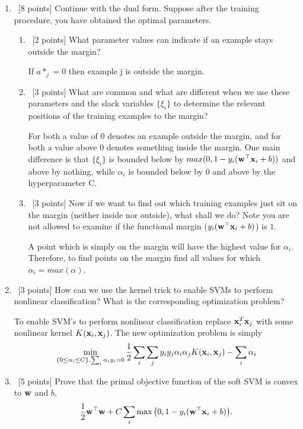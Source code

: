 \documentclass[12pt, fullpage,letterpaper]{article}
\begin{document}
\begin{enumerate}
	\item~[8 points] Continue with the dual form. Suppose after the training procedure, you have obtained the optimal parameters.
	\begin{enumerate}
		\item~[2 points] What parameter values can indicate if an example stays outside the margin?
		
		If $a*_j = 0$ then example j is outside the margin.
		
		\item~[3 points] What are common and what are different when we use these parameters and the slack variables $\{\xi_i\}$ to determine the relevant positions of the training examples to the margin?
		
		For both a value of 0 denotes an example outside the margin, and for both a value above 0 denotes something inside the margin. One main difference is that $\{\xi_i\}$ is bounded below by $max(0, 1 - y_i({\bf w}^\top {\bf x}_i + b))$ and above by nothing, while $\alpha_i$ is bounded below by 0 and above by the hyperparameter C.
		
		\item~[3 points] Now if we want to find out which training examples just sit on the margin (neither inside nor outside), what shall we do? Note you are not allowed to examine if the functional margin (\ie $y_i({\bf w}^\top{\bf x}_i +b)$) is $1$.
		
		A point which is simply on the margin will have the highest value for $\alpha_i$. Therefore, to find points on the margin find all values for which $\alpha_i = max(\alpha)$.
		
	\end{enumerate}
	
	
	\item~[3 points] How can we use the kernel trick to enable SVMs to perform nonlinear classification? What is the corresponding optimization problem?
	
	To enable SVM's to perform nonlinear classification replace ${\bf x}_i^T{\bf x}_j$ with some nonlinear kernel $K({\bf x}_i, {\bf x}_j)$. The new optimization problem is simply \[
	\min\limits_{\{0 \le \alpha_i \le C\}, \sum_i \alpha_i y_i = 0} \frac{1}{2} \sum_i \sum_j y_i y_j \alpha_i \alpha_j K({\bf x}_i, {\bf x}_j) - \sum_{i} \alpha_i
	\]


	\item~[5 points] Prove that the primal objective function of the soft SVM is convex to ${\bf w}$ and $b$, 
	\[
	\frac{1}{2}{\bf w}^\top{\bf w} + C\sum_{i} \max\big(0, 1 - y_i({\bf w}^\top{\bf x}_i+b)\big).
	\]
	

\end{enumerate}
\end{document}

